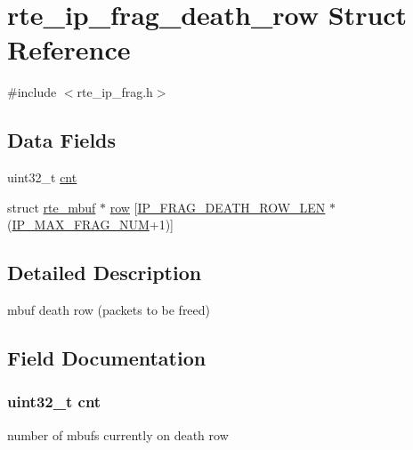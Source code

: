 \hypertarget{structrte__ip__frag__death__row}{}\section{rte\+\_\+ip\+\_\+frag\+\_\+death\+\_\+row Struct Reference}
\label{structrte__ip__frag__death__row}


{\ttfamily \#include $<$rte\+\_\+ip\+\_\+frag.\+h$>$}

\subsection*{Data Fields}
\begin{DoxyCompactItemize}
\item 
uint32\+\_\+t \hyperlink{structrte__ip__frag__death__row_a884497f3269a8ae82bcd0a4814997702}{cnt}
\item 
struct \hyperlink{structrte__mbuf}{rte\+\_\+mbuf} $\ast$ \hyperlink{structrte__ip__frag__death__row_adbd3344a72dfab0c09734b282c0a4f2b}{row} \mbox{[}\hyperlink{rte__ip__frag_8h_a42258c62091fdfe18263215c9682964c}{I\+P\+\_\+\+F\+R\+A\+G\+\_\+\+D\+E\+A\+T\+H\+\_\+\+R\+O\+W\+\_\+\+L\+E\+N} $\ast$(\hyperlink{rte__ip__frag_8h_adb49720dc49f7d4e4cf9adbf2948e409afe920c928a60243e882269a26376c418}{I\+P\+\_\+\+M\+A\+X\+\_\+\+F\+R\+A\+G\+\_\+\+N\+U\+M}+1)\mbox{]}
\end{DoxyCompactItemize}


\subsection{Detailed Description}
mbuf death row (packets to be freed) 

\subsection{Field Documentation}
\hypertarget{structrte__ip__frag__death__row_a884497f3269a8ae82bcd0a4814997702}{}
\subsubsection[{cnt}]{\setlength{\rightskip}{0pt plus 5cm}uint32\+\_\+t cnt}\label{structrte__ip__frag__death__row_a884497f3269a8ae82bcd0a4814997702}
number of mbufs currently on death row \hypertarget{structrte__ip__frag__death__row_adbd3344a72dfab0c09734b282c0a4f2b}{}
